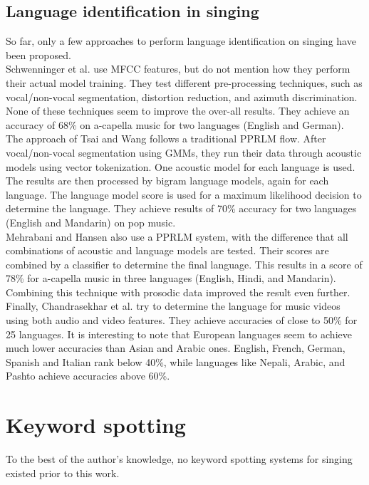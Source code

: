 \subsection{Language identification in singing}
So far, only a few approaches to perform language identification on singing have been proposed.\\
Schwenninger et al. \cite{schwenninger} use MFCC features, but do not mention how they perform their actual model training. They test different pre-processing techniques, such as vocal/non-vocal segmentation, distortion reduction, and azimuth discrimination. None of these techniques seem to improve the over-all results. They achieve an accuracy of 68\% on a-capella music for two languages (English and German).\\
The approach of Tsai and Wang \cite{tsai_wang} follows a traditional PPRLM flow. After vocal/non-vocal segmentation using GMMs, they run their data through acoustic models using vector tokenization. One acoustic model for each language is used. The results are then processed by bigram language models, again for each language. The language model score is used for a maximum likelihood decision to determine the language. They achieve results of 70\% accuracy for two languages (English and Mandarin) on pop music.\\
Mehrabani and Hansen \cite{mehrabani} also use a PPRLM system, with the difference that all combinations of acoustic and language models are tested. Their scores are combined by a classifier to determine the final language. This results in a score of 78\% for a-capella music in three languages (English, Hindi, and Mandarin). Combining this technique with prosodic data improved the result even further.\\
Finally, Chandrasekhar et al.\cite {chandrasekhar} try to determine the language for music videos using both audio and video features. They achieve accuracies of close to 50\% for 25 languages. It is interesting to note that European languages seem to achieve much lower accuracies than Asian and Arabic ones. English, French, German, Spanish and Italian rank below 40\%, while languages like Nepali, Arabic, and Pashto achieve accuracies above 60\%.


\section{Keyword spotting}
To the best of the author's knowledge, no keyword spotting systems for singing existed prior to this work.

